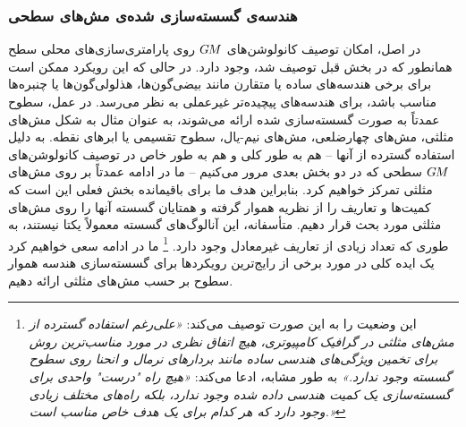 \subsubsection{هندسه‌ی گسسته‌سازی شده‌ی مش‌های سطحی}
\label{sec:surfaces_geom_mesh}

در اصل، امکان توصیف کانولوشن‌های $G\mkern-1.4muM$ روی پارامتری‌سازی‌های محلی سطح همانطور که در بخش قبل توصیف شد، وجود دارد.
در حالی که این رویکرد ممکن است برای برخی هندسه‌های ساده یا متقارن مانند بیضی‌گون‌ها، هذلولی‌گون‌ها یا چنبره‌ها مناسب باشد، برای هندسه‌های پیچیده‌تر غیرعملی به نظر می‌رسد.
در عمل، سطوح عمدتاً به صورت گسسته‌سازی شده ارائه می‌شوند، به عنوان مثال به شکل مش‌های مثلثی، مش‌های چهارضلعی، مش‌های نیم-یال، سطوح تقسیمی یا ابرهای نقطه.
به دلیل استفاده گسترده از آنها -- هم به طور کلی و هم به طور خاص در توصیف کانولوشن‌های $G\mkern-1.4muM$ سطحی که در دو بخش بعدی مرور می‌کنیم -- ما در ادامه عمدتاً بر روی مش‌های مثلثی تمرکز خواهیم کرد.
بنابراین هدف ما برای باقیمانده بخش فعلی این است که کمیت‌ها و تعاریف را از نظریه هموار گرفته و همتایان گسسته آنها را روی مش‌های مثلثی مورد بحث قرار دهیم.
متأسفانه، این آنالوگ‌های گسسته معمولاً یکتا نیستند، به طوری که تعداد زیادی از تعاریف غیرمعادل وجود دارد.%
\footnote{
    \citet{meyer2003discrete} این وضعیت را به این صورت توصیف می‌کند:
    \emph{«علی‌رغم استفاده گسترده از مش‌های مثلثی در گرافیک کامپیوتری، هیچ اتفاق نظری در مورد مناسب‌ترین روش برای تخمین ویژگی‌های هندسی ساده مانند بردارهای نرمال و انحنا روی سطوح گسسته وجود ندارد.»}
    به طور مشابه، \citet{craneDiscreteDifferentialGeometry2014} ادعا می‌کند:
    \emph{«هیچ راه "درست" واحدی برای گسسته‌سازی یک کمیت هندسی داده شده وجود ندارد، بلکه راه‌های مختلف زیادی وجود دارد که هر کدام برای یک هدف خاص مناسب است.»}
}
ما در ادامه سعی خواهیم کرد یک ایده کلی در مورد برخی از رایج‌ترین رویکردها برای گسسته‌سازی هندسه هموار سطوح بر حسب مش‌های مثلثی ارائه دهیم.


